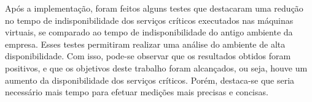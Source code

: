 Após a implementação, foram feitos alguns testes que destacaram uma redução no tempo de indisponibilidade dos serviços 
críticos executados nas máquinas virtuais, se comparado ao tempo de indisponibilidade do antigo ambiente da empresa. 
Esses testes permitiram realizar uma análise do ambiente de alta disponibilidade.
Com isso, pode-se observar que os resultados obtidos foram positivos, e que os objetivos deste trabalho foram alcançados, ou seja, houve um 
aumento da disponibilidade dos serviços críticos. Porém, destaca-se que seria necessário mais tempo para efetuar medições mais precisas e concisas.

